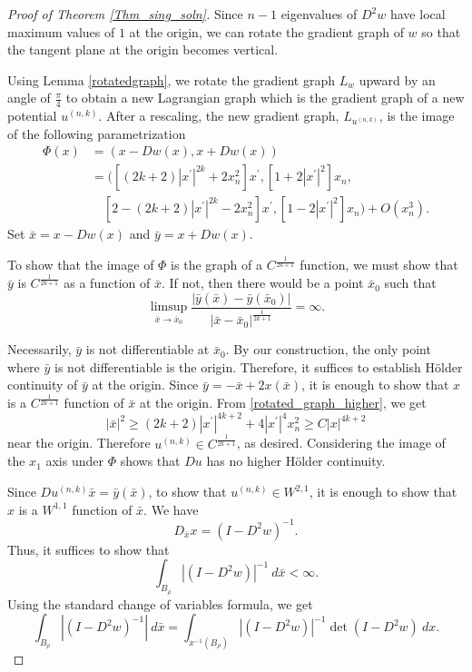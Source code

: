 \documentclass[12pt,reqno]{amsart}%
\theoremstyle{plain}
\numberwithin{equation}{section}
\theoremstyle{definition}
\theoremstyle{remark}
\begin{document}
\begin{proof}[Proof of Theorem \ref{Thm_sing_soln}]
Since $n-1$ eigenvalues of $D^2 w$ have local maximum values of $1$ at the origin, we can rotate the gradient graph of $w$ so that the tangent plane at the origin becomes vertical. 

Using Lemma \ref{rotatedgraph}, we rotate the gradient graph $L_w$ upward by an angle of $\frac \pi 4 $ to obtain a new Lagrangian graph which is the gradient graph of a new potential $u^{(n,k)}$. After a rescaling, the new gradient graph, $L_{u^{(n,k)}}$, is the image of the following parametrization
\begin{equation}\begin{aligned} 
\Phi ( x) &= (x - Dw(x), x + Dw(x)) \\
& = ( [(2k+2) |x^\prime | ^{2k}+2x_n^2 ] x^\prime , [1 + 2 | x^\prime |^2 ]x_n,\\ & \quad  [2-(2k+2) |x^\prime | ^{2k}-2x_n^2 ]x^\prime , [1-2 |x^\prime |^2] x_n ) + O ( x_n^3). \label{rotated_graph_higher}
\end{aligned} \end{equation}
Set $\bar x = x - Dw(x)$ and $\bar y = x + Dw(x).$

To show that the image of $\Phi$ is the graph of a $C^{\frac{1}{2k+1}}$ function, we must show that $\bar y$ is $C^{\frac{1}{2k+1}} $ as a function of $\bar x$. If not, then there would be a point $\bar x_0$ such that 
$$ \limsup_{ \bar x \to \bar x_0} \frac{ | \bar y ( \bar x ) - \bar y ( \bar x_0 ) |}{|\bar x - \bar x_0|^{\frac{1}{2k+1}}} = \infty .$$

Necessarily, $\bar y $ is not differentiable at $\bar x_0$. By our construction, the only point where $\bar y$ is not differentiable is the origin. Therefore, it suffices to establish H\"older continuity of $\bar y$ at the origin. Since $\bar y = - \bar x + 2 x ( \bar x ) $, it is enough to show that $x $ is a $C^{\frac 1 {2k+1} }$ function of $\bar x$ at the origin. From \eqref{rotated_graph_higher}, we get 
$$ |\bar x | ^2 \geq ( 2k + 2 ) |x^\prime | ^{4k+2 } + 4 | x^\prime | ^4 x_n^2 \geq C |x|^{4k+2} $$
near the origin. 
Therefore $u^{(n,k)}  \in C^{\frac{1}{2k+1}}$, as desired.
Considering the image of the $x_1$ axis under $\Phi$ shows that $Du$ has no higher H\"older continuity. 

Since $Du^{(n,k)} \bar x = \bar y( \bar x) $, to show that $u^{(n,k)} \in W^{2,1}$, it is enough to show that $x$ is a $W^{1,1}$ function of $\bar x$. 
We have 
$$ D_{ \bar x } x = ( I - D^2 w ) ^{-1} .$$
Thus, it suffices to show that 
$$ \int_{B_\rho} | (I - D^2 w ) |^{-1}  \: d\bar x < \infty.$$
Using the standard change of variables formula, we get
$$ \int_{B_\rho} | (I - D^2 w ) ^{-1}| \: d\bar x = \int _{x^{-1} (B_\rho)} | (I - D^2 w )| ^{-1}  \det ( I - D^2 w ) \: dx. $$




\end{proof}
\end{document}

